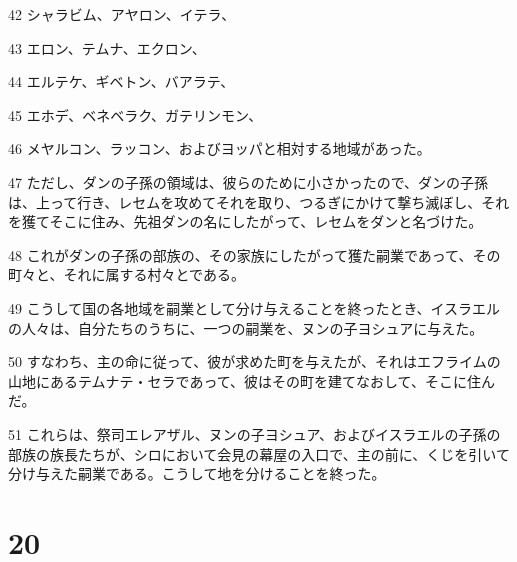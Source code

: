 \par 42 シャラビム、アヤロン、イテラ、
\par 43 エロン、テムナ、エクロン、
\par 44 エルテケ、ギベトン、バアラテ、
\par 45 エホデ、ベネベラク、ガテリンモン、
\par 46 メヤルコン、ラッコン、およびヨッパと相対する地域があった。
\par 47 ただし、ダンの子孫の領域は、彼らのために小さかったので、ダンの子孫は、上って行き、レセムを攻めてそれを取り、つるぎにかけて撃ち滅ぼし、それを獲てそこに住み、先祖ダンの名にしたがって、レセムをダンと名づけた。
\par 48 これがダンの子孫の部族の、その家族にしたがって獲た嗣業であって、その町々と、それに属する村々とである。
\par 49 こうして国の各地域を嗣業として分け与えることを終ったとき、イスラエルの人々は、自分たちのうちに、一つの嗣業を、ヌンの子ヨシュアに与えた。
\par 50 すなわち、主の命に従って、彼が求めた町を与えたが、それはエフライムの山地にあるテムナテ・セラであって、彼はその町を建てなおして、そこに住んだ。
\par 51 これらは、祭司エレアザル、ヌンの子ヨシュア、およびイスラエルの子孫の部族の族長たちが、シロにおいて会見の幕屋の入口で、主の前に、くじを引いて分け与えた嗣業である。こうして地を分けることを終った。

\chapter{20}

